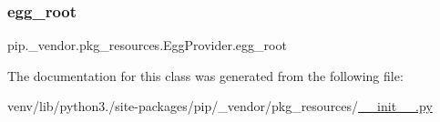 \mbox{\label{classpip_1_1__vendor_1_1pkg__resources_1_1EggProvider_af9cf88ad0344c406f642b8a189ec8fd8}} 
\subsubsection{\texorpdfstring{egg\+\_\+root}{egg\_root}}
{\footnotesize\ttfamily pip.\+\_\+vendor.\+pkg\+\_\+resources.\+Egg\+Provider.\+egg\+\_\+root}



The documentation for this class was generated from the following file\+:\begin{DoxyCompactItemize}
\item 
venv/lib/python3./site-\/packages/pip/\+\_\+vendor/pkg\+\_\+resources/\hyperlink{venv_2lib_2python3_89_2site-packages_2pip_2__vendor_2pkg__resources_2____init_____8py}{\+\_\+\+\_\+init\+\_\+\+\_\+.\+py}\end{DoxyCompactItemize}
